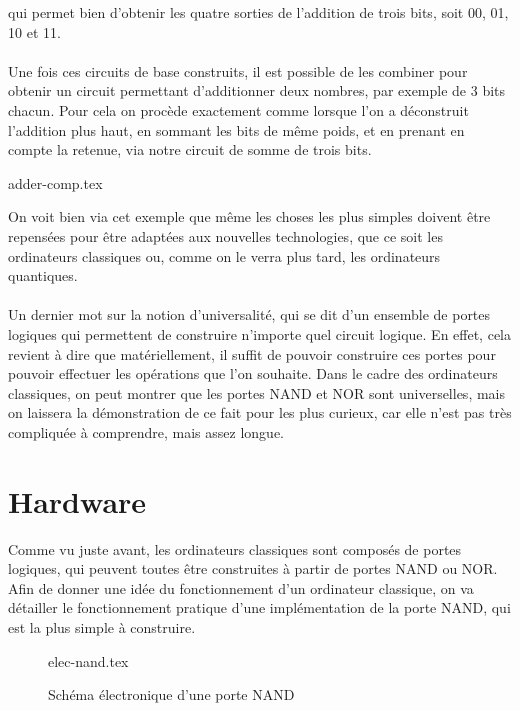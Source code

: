 qui permet bien d'obtenir les quatre sorties de l'addition de trois bits, soit 00, 01, 10 et 11.\\ \\
Une fois ces circuits de base construits, il est possible de les combiner pour obtenir un circuit permettant
d'additionner deux nombres, par exemple de 3 bits chacun.
Pour cela on procède exactement comme lorsque l'on a déconstruit l'addition plus haut, en sommant les bits
de même poids, et en prenant en compte la retenue, via notre circuit de somme de trois bits.

{adder-comp.tex}

On voit bien via cet exemple que même les choses les plus simples doivent être repensées pour être adaptées
aux nouvelles technologies, que ce soit les ordinateurs classiques ou, comme on le verra plus tard, les
ordinateurs quantiques.\\ \\
Un dernier mot sur la notion d'universalité, qui se dit d'un ensemble de portes logiques qui permettent
de construire n'importe quel circuit logique.
En effet, cela revient à dire que matériellement, il suffit de pouvoir construire ces portes pour pouvoir
effectuer les opérations que l'on souhaite.
Dans le cadre des ordinateurs classiques, on peut montrer que les portes NAND et NOR sont universelles, mais on
laissera la démonstration de ce fait pour les plus curieux, car elle n'est pas très compliquée à comprendre, mais
assez longue.

\section{Hardware}\label{sec:hardware}

Comme vu juste avant, les ordinateurs classiques sont composés de portes logiques, qui peuvent toutes être
construites à partir de portes NAND ou NOR.
Afin de donner une idée du fonctionnement d'un ordinateur classique, on va détailler le fonctionnement pratique
d'une implémentation de la porte NAND, qui est la plus simple à construire.

\begin{figure}[H]
    \centering
    {elec-nand.tex}
    \caption{Schéma électronique d'une porte NAND}
    \label{fig:elec-nand}
\end{figure}


